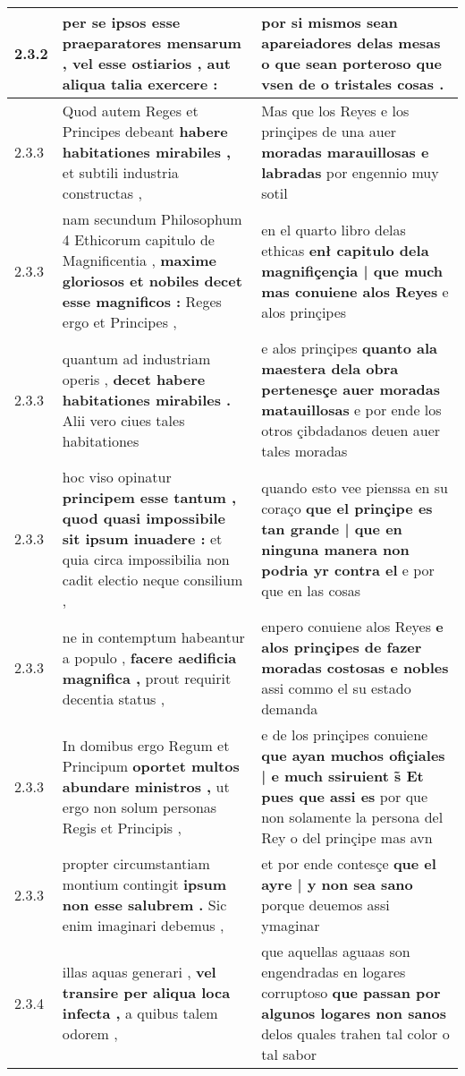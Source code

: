 \begin{tabular}{|p{1cm}|p{6.5cm}|p{6.5cm}|}
2.3.2 & per se ipsos esse praeparatores mensarum , \textbf{ vel esse ostiarios , } aut aliqua talia exercere : & por si mismos sean apareiadores delas mesas \textbf{ o que sean porteroso } que vsen de o tristales cosas . \\\hline
2.3.3 & Quod autem Reges et Principes debeant \textbf{ habere habitationes mirabiles , } et subtili industria constructas , & Mas que los Reyes e los prinçipes de una auer \textbf{ moradas marauillosas e labradas } por engennio muy sotil \\\hline
2.3.3 & nam secundum Philosophum 4 Ethicorum capitulo de Magnificentia , \textbf{ maxime gloriosos et nobiles decet esse magnificos : } Reges ergo et Principes , & en el quarto libro delas ethicas \textbf{ enł capitulo dela magnifiçençia | que much mas conuiene alos Reyes } e alos prinçipes \\\hline
2.3.3 & quantum ad industriam operis , \textbf{ decet habere habitationes mirabiles . } Alii vero ciues tales habitationes & e alos prinçipes \textbf{ quanto ala maestera dela obra pertenesçe auer moradas matauillosas } e por ende los otros çibdadanos deuen auer tales moradas \\\hline
2.3.3 & hoc viso opinatur \textbf{ principem esse tantum , quod quasi impossibile sit ipsum inuadere : } et quia circa impossibilia non cadit electio neque consilium , & quando esto vee pienssa en su coraço \textbf{ que el prinçipe es tan grande | que en ninguna manera non podria yr contra el } e por que en las cosas \\\hline
2.3.3 & ne in contemptum habeantur a populo , \textbf{ facere aedificia magnifica , } prout requirit decentia status , & enpero conuiene alos Reyes \textbf{ e alos prinçipes de fazer moradas costosas e nobles } assi commo el su estado demanda \\\hline
2.3.3 & In domibus ergo Regum et Principum \textbf{ oportet multos abundare ministros , } ut ergo non solum personas Regis et Principis , & e de los prinçipes conuiene \textbf{ que ayan muchos ofiçiales | e much ssiruient s̃ Et pues que assi es } por que non solamente la persona del Rey o del prinçipe mas avn \\\hline
2.3.3 & propter circumstantiam montium contingit \textbf{ ipsum non esse salubrem . } Sic enim imaginari debemus , & et por ende contesçe \textbf{ que el ayre | y non sea sano } porque deuemos assi ymaginar \\\hline
2.3.4 & illas aquas generari , \textbf{ vel transire per aliqua loca infecta , } a quibus talem odorem , & que aquellas aguaas son engendradas en logares corruptoso \textbf{ que passan por algunos logares non sanos } delos quales trahen tal color o tal sabor \\\hline

\end{tabular}
